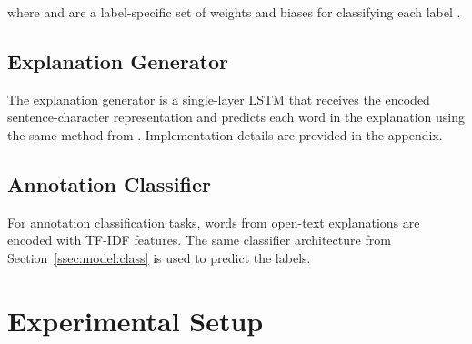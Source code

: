 \documentclass[11pt,a4paper]{article}
\begin{document}
\noindent where  and  are a label-specific set of weights and biases for classifying each label .

\subsection{Explanation Generator} The explanation generator is a single-layer LSTM \cite{hochreiter1997long} that receives the encoded sentence-character representation  and predicts each word  in the explanation using the same method from \citet{seq2seq}. Implementation details are provided in the appendix.

\subsection{Annotation Classifier}

For annotation classification tasks, words from open-text explanations are encoded with TF-IDF features. The same classifier architecture from Section~\ref{ssec:model:class} is used to predict the labels.
 \section{Experimental Setup}
\end{document}
